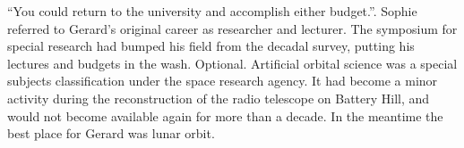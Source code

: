 

``You could return to the university and accomplish either budget.''.
Sophie referred to Gerard's original career as researcher and
lecturer.  The symposium for special research had bumped his field
from the decadal survey, putting his lectures and budgets in the wash.
Optional.  Artificial orbital science was a special subjects
classification under the space research agency.  It had become a minor
activity during the reconstruction of the radio telescope on Battery
Hill, and would not become available again for more than a decade.  In
the meantime the best place for Gerard was lunar orbit.

\bye
